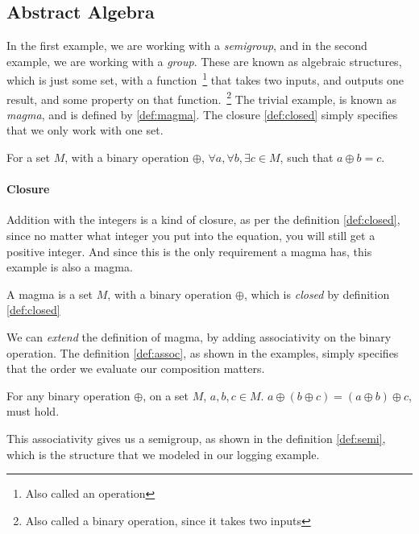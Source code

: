 \subsection{Abstract Algebra}

In the first example, we are working with a \textit{semigroup}, and in the
second example, we are working with a \textit{group}. These are known as
algebraic structures, which is just some set, with a function~\footnote{Also called an operation}
that takes two inputs, and outputs one result, and some property on that
function.~\footnote{Also called a binary operation, since it takes two inputs}
The trivial example, is known as \textit{magma}, and is defined by
\ref{def:magma}. The closure \ref{def:closed} simply specifies that we only work
with one set.

\begin{definition}[Closure] \label{def:closed}
  For a set $M$, with a binary operation $\oplus$,
  $\forall a, \forall b, \exists c \in M$, such that
  $a \oplus b = c$.
\end{definition}

\paragraph{Closure} Addition with the integers is a kind of closure, as per the
definition \ref{def:closed}, since no matter what integer you put into the
equation, you will still get a positive integer. And since this is the only
requirement a magma has, this example is also a magma.

\begin{definition}[Magma] \label{def:magma}
  A magma is a set $M$, with a binary operation $\oplus$, which is
  \textit{closed} by definition \ref{def:closed}
\end{definition}

We can \textit{extend} the definition of magma, by adding associativity on the
binary operation. The definition \ref{def:assoc}, as shown in the examples,
simply specifies that the order we evaluate our composition matters.

\begin{definition} \label{def:assoc}
  For any binary operation $\oplus$, on a set $M$, $a, b, c \in M$.
  $a \oplus \left ( b \oplus c \right ) = \left ( a \oplus b \right ) \oplus c$,
  must hold.
\end{definition}

This associativity gives us a semigroup, as shown in the definition
\ref{def:semi}, which is the structure that we modeled in our logging example.

